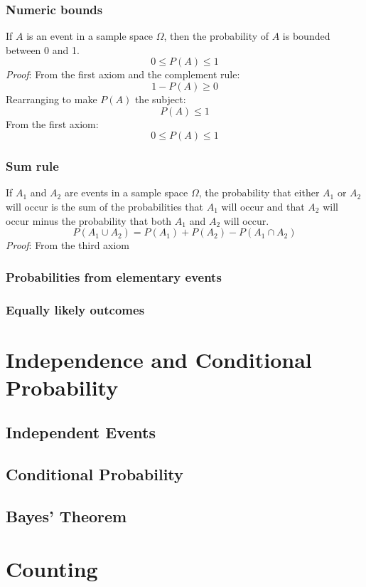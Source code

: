 \documentclass{article}
\begin{document}
\subsubsection{Numeric bounds}

If $A$ is an event in a sample space $\Omega$, then the probability of $A$ is bounded between 0 and 1.
\[0\leq P(A) \leq 1\]
\textit{Proof}: From the first axiom and the complement rule:
\[1-P(A) \geq 0\]
Rearranging to make $P(A)$ the subject:
\[P(A) \leq 1\]
From the first axiom:
\[0 \leq P(A) \leq 1\]

\subsubsection{Sum rule}

If $A_1$ and $A_2$ are events in a sample space $\Omega$, the probability that either $A_1$ or $A_2$ will occur is the sum of the probabilities that $A_1$ will occur and that $A_2$ will occur minus the probability that both $A_1$ and $A_2$ will occur.
\[P(A_1 \cup A_2)=P(A_1)+P(A_2)-P(A_1 \cap A_2)\]
\textit{Proof}: From the third axiom

\subsubsection{Probabilities from elementary events}

\subsubsection{Equally likely outcomes}


\section{Independence and Conditional Probability}

\subsection{Independent Events}
\subsection{Conditional Probability}
\subsection{Bayes' Theorem}

\section{Counting}
\end{document}
